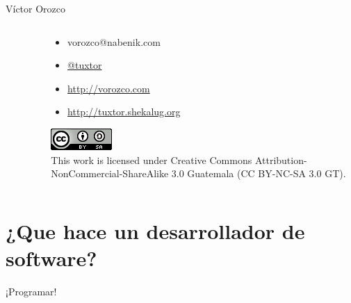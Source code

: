 \documentclass[aspectratio=169]{beamer}
\begin{document}
\begin{frame}{Víctor Orozco}
\begin{columns}[T]
\begin{column}[T]{4cm}
\begin{figure}
            \end{figure}
        \end{column}
        \begin{column}[T]{6cm} %
            \begin{itemize}
                \item vorozco@nabenik.com
                \item \href{https://twitter.com/tuxtor}{@tuxtor}
                \item \href{http://vorozco.com}{http://vorozco.com}
                \item \href{http://tuxtor.shekalug.org}{http://tuxtor.shekalug.org}
            \end{itemize}
            \begin{center}
                \includegraphics[width=0.1\linewidth]{Images/cclogo}
                \\
                This work is licensed under Creative Commons Attribution-NonCommercial-ShareAlike 3.0 Guatemala (CC BY-NC-SA 3.0 GT).
            \end{center}
        \end{column}
    \end{columns}
\end{frame}

\section{¿Que hace un desarrollador de software?}

\begin{frame}
    \huge ¡Programar!
\end{frame}
\end{document}
